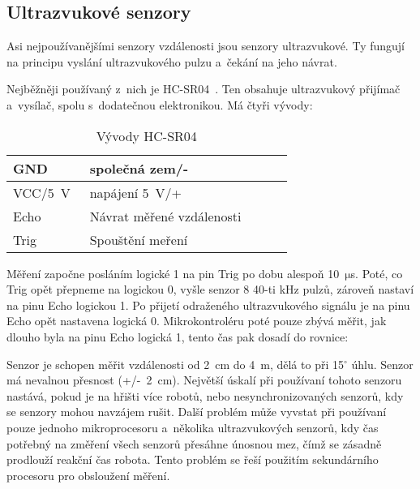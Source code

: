 \subsection{Ultrazvukové senzory}

Asi nejpoužívanějšími senzory vzdálenosti jsou senzory ultrazvukové.
Ty fungují na principu vyslání ultrazvukového pulzu a~čekání na jeho návrat.

Nejběžněji používaný z~nich je HC-SR04~\cite{hc-sr04}. 
Ten obsahuje ultrazvukový přijímač a~vysílač, spolu s~dodatečnou elektronikou.
Má čtyři vývody: 
\begin{table}[h]
	
	\centering
	\begin{tabular}{|l|l|l|l|l|} \hline
		GND & společná zem/-   \\ \hline
		VCC/5~V~& napájení 5~V/+  \\ \hline
		Echo & Návrat měřené vzdálenosti   \\ \hline
		Trig & Spouštění meření \\ \hline
    \end{tabular}
    \caption{Vývody HC-SR04}
\end{table}

Měření započne posláním logické 1 na pin Trig po dobu alespoň 10~$\mathrm{\mu}$s.
Poté, co Trig opět přepneme na logickou 0, vyšle senzor 8 40-ti kHz pulzů, zároveň nastaví na pinu Echo logickou 1.
Po přijetí odraženého ultrazvukového signálu je na pinu Echo opět nastavena logická 0.
Mikrokontroléru poté pouze zbývá měřit, jak dlouho byla na pinu Echo logická 1, tento čas pak dosadí do rovnice:
    
    
Senzor je schopen měřit vzdálenosti od 2~cm do 4~m, dělá to při 15$^{\circ}$ úhlu.
Senzor má nevalnou přesnost (+/-~2~cm).
Největší úskalí při používaní tohoto senzoru nastává, pokud je na hřišti více robotů, nebo nesynchronizovaných senzorů, kdy se senzory mohou navzájem rušit.
Další problém může vyvstat při používaní pouze jednoho mikroprocesoru a~několika ultrazvukových senzorů, kdy čas potřebný na změření všech senzorů přesáhne únosnou mez, čímž se zásadně prodlouží reakční čas robota.
Tento problém se řeší použitím sekundárního procesoru pro obsloužení měření.



